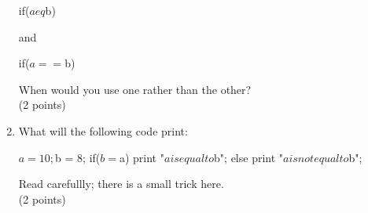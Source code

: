 \documentclass[11pt]{article}
\begin{document}
\begin{enumerate}
  \begin{perlcode}
    if($a eq $b)
  \end{perlcode}
  and

  \begin{perlcode}
    if($a == $b)
  \end{perlcode}
  When would you use one rather than the other?\\
  (2 points)
\item What will the following code print:

  \begin{perlcode}
  $a = 10;
  $b = 8;
  if($b = $a){
    print "$a is equal to $b\n";
  }else{
    print "$a is not equal to $b\n";
  }
  \end{perlcode}
  Read carefullly; there is a small trick here.\\
  (2 points)
\end{enumerate}
\end{document}
